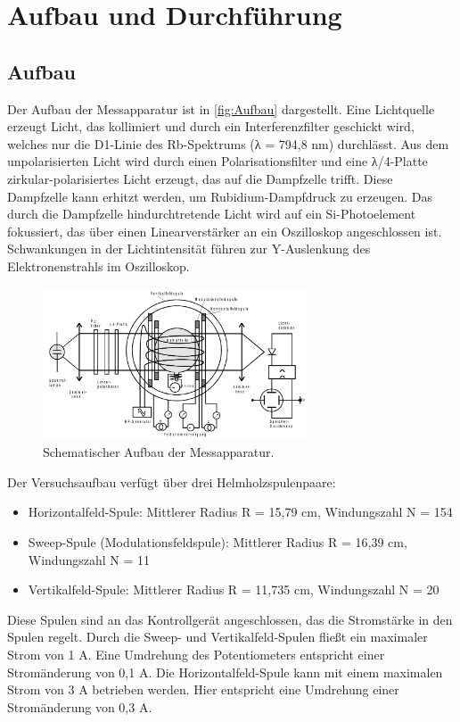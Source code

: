\section{Aufbau und Durchführung}
\subsection{Aufbau}
\label{subsec:Aufbau}
Der Aufbau der Messapparatur ist in \autoref{fig:Aufbau} dargestellt. Eine Lichtquelle erzeugt Licht, das kollimiert und durch ein Interferenzfilter geschickt wird, welches nur die D1-Linie des 
Rb-Spektrums (λ = 794,8 nm) durchlässt. Aus dem unpolarisierten Licht wird durch einen Polarisationsfilter und eine λ/4-Platte zirkular-polarisiertes Licht erzeugt, das auf die Dampfzelle trifft.
Diese Dampfzelle kann erhitzt werden, um Rubidium-Dampfdruck zu erzeugen. Das durch die Dampfzelle hindurchtretende Licht wird auf ein Si-Photoelement fokussiert,
das über einen Linearverstärker an ein Oszilloskop angeschlossen ist. Schwankungen in der Lichtintensität führen zur Y-Auslenkung des Elektronenstrahls im Oszilloskop.\\
\begin{figure}[H]
    \centering
    \includegraphics[width=0.7\textwidth]{images/aufbau.png}
    \caption{Schematischer Aufbau der Messapparatur. \cite{V21}}
    \label{fig:Aufbau}
\end{figure}

Der Versuchsaufbau verfügt über drei Helmholzspulenpaare:
\begin{itemize}
    \item Horizontalfeld-Spule: Mittlerer Radius R = 15,79 cm, Windungszahl N = 154
    \item Sweep-Spule (Modulationsfeldspule): Mittlerer Radius R = 16,39 cm, Windungszahl N = 11
    \item Vertikalfeld-Spule: Mittlerer Radius R = 11,735 cm, Windungszahl N = 20
\end{itemize}
Diese Spulen sind an das Kontrollgerät angeschlossen, das die Stromstärke in den Spulen regelt. 
Durch die Sweep- und Vertikalfeld-Spulen fließt ein maximaler Strom von 1 A. Eine Umdrehung des Potentiometers entspricht einer Stromänderung von 0,1 A.
Die Horizontalfeld-Spule kann mit einem maximalen Strom von 3 A betrieben werden. Hier entspricht eine Umdrehung einer Stromänderung von 0,3 A.\\

